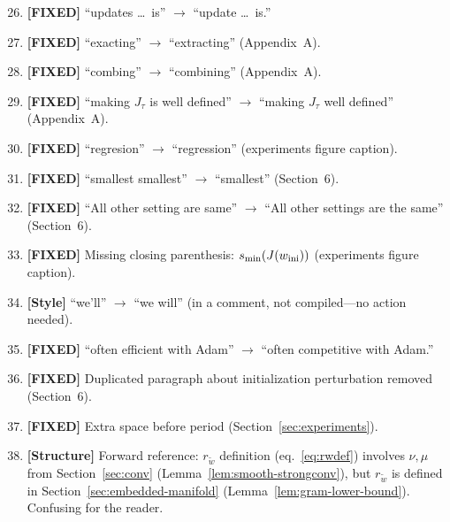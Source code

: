 \documentclass[twoside,11pt]{article}
\begin{document}
\begin{enumerate}\setcounter{enumi}{25}
\item {\color{green!50!black}\textbf{[FIXED]}} ``updates \ldots\ is'' $\to$ ``update \ldots\ is.''

\item {\color{green!50!black}\textbf{[FIXED]}} ``exacting'' $\to$ ``extracting'' (Appendix~A).

\item {\color{green!50!black}\textbf{[FIXED]}} ``combing'' $\to$ ``combining'' (Appendix~A).

\item {\color{green!50!black}\textbf{[FIXED]}} ``making $J_\tau$ is well defined'' $\to$ ``making $J_\tau$ well defined'' (Appendix~A).

\item {\color{green!50!black}\textbf{[FIXED]}} ``regresion'' $\to$ ``regression'' (experiments figure caption).

\item {\color{green!50!black}\textbf{[FIXED]}} ``smallest smallest'' $\to$ ``smallest'' (Section~6).

\item {\color{green!50!black}\textbf{[FIXED]}} ``All other setting are same'' $\to$ ``All other settings are the same'' (Section~6).

\item {\color{green!50!black}\textbf{[FIXED]}} Missing closing parenthesis: $s_{\min}(J(w_{\rm ini}))$ (experiments figure caption).

\item {\color{red}\textbf{[Style]}} ``we'll'' $\to$ ``we will'' (in a comment, not compiled---no action needed).

\item {\color{green!50!black}\textbf{[FIXED]}} ``often efficient with Adam'' $\to$ ``often competitive with Adam.''

\item {\color{green!50!black}\textbf{[FIXED]}} Duplicated paragraph about initialization perturbation removed (Section~6).

\item {\color{green!50!black}\textbf{[FIXED]}} Extra space before period (Section~\ref{sec:experiments}).

\item {\color{red}\textbf{[Structure]} Forward reference:} $r_{\tilde w}$ definition (eq.~\eqref{eq:rwdef})
    involves $\nu,\mu$ from Section~\ref{sec:conv} (Lemma~\ref{lem:smooth-strongconv}),
    but $r_{\tilde w}$ is defined in Section~\ref{sec:embedded-manifold} (Lemma~\ref{lem:gram-lower-bound}).
    Confusing for the reader.


\end{enumerate}
\end{document}
